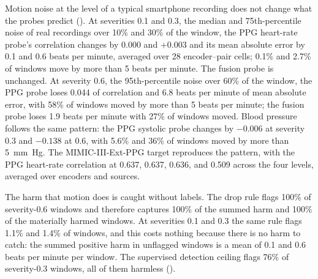 \documentclass[pmlr,twocolumn,10pt]{jmlr}
\begin{document}
Motion noise at the level of a typical smartphone recording does not change what the probes predict (). At severities 0.1 and 0.3, the median and 75th-percentile noise of real recordings over 10\% and 30\% of the window, the PPG heart-rate probe's correlation changes by 0.000 and $+0.003$ and its mean absolute error by 0.1 and 0.6 beats per minute, averaged over 28 encoder--pair cells; 0.1\% and 2.7\% of windows move by more than 5 beats per minute. The fusion probe is unchanged. At severity 0.6, the 95th-percentile noise over 60\% of the window, the PPG probe loses 0.044 of correlation and 6.8 beats per minute of mean absolute error, with 58\% of windows moved by more than 5 beats per minute; the fusion probe loses 1.9 beats per minute with 27\% of windows moved. Blood pressure follows the same pattern: the PPG systolic probe changes by $-0.006$ at severity 0.3 and $-0.138$ at 0.6, with 5.6\% and 36\% of windows moved by more than 5~\si{\milli\meter Hg}. The MIMIC-III-Ext-PPG target reproduces the pattern, with the PPG heart-rate correlation at 0.637, 0.637, 0.636, and 0.509 across the four levels, averaged over encoders and sources.

The harm that motion does is caught without labels. The drop rule flags 100\% of severity-0.6 windows and therefore captures 100\% of the summed harm and 100\% of the materially harmed windows. At severities 0.1 and 0.3 the same rule flags 1.1\% and 1.4\% of windows, and this costs nothing because there is no harm to catch: the summed positive harm in unflagged windows is a mean of 0.1 and 0.6 beats per minute per window. The supervised detection ceiling flags 76\% of severity-0.3 windows, all of them harmless ().
\end{document}
